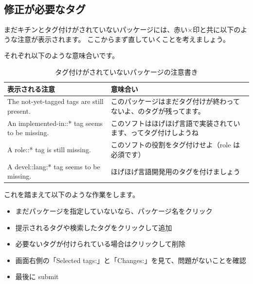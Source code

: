 \documentclass[mingoth,a4paper]{jsarticle}
\begin{document}
\clearpage

\subsection{修正が必要なタグ}

まだキチンとタグ付けがされていないパッケージには、赤い×印と共に以下のような注意が表示されます。
ここからまず直していくことを考えましょう。

それぞれ以下のような意味合いです。

   \begin{table}[h]
    \begin{center}
      {
        \begin{tabular}{l|l} \hline
                表示される注意 & 意味合い \\ \hline \hline
The not-yet-tagged tags are still present. & このパッケージはまだタグ付けが終わってないよ、のタグが残ってます。 \\
An implemented-in::* tag seems to be missing. & このソフトはほげほげ言語で実装されています、ってタグ付けしようね \\
A role::* tag is still missing. & このソフトの役割をタグ付けせよ（role は必須です） \\
A devel::lang:* tag seems to be missing. & ほげほげ言語開発用のタグを付けましょう \\
           \end{tabular}
        }
     \caption{タグ付けがされていないパッケージの注意書き}
     \label{tagwarning}
    \end{center}
    \end{table}

これを踏まえて以下のような作業をします。

\begin{itemize}
 \item まだパッケージを指定していないなら、パッケージ名をクリック
 \item 提示されるタグや検索したタグをクリックして追加
 \item 必要ないタグが付けられている場合はクリックして削除
 \item 画面右側の「Selected tags:」と「Changes:」を見て、問題がないことを確認
 \item 最後に submit 
\end{itemize}
\end{document}
